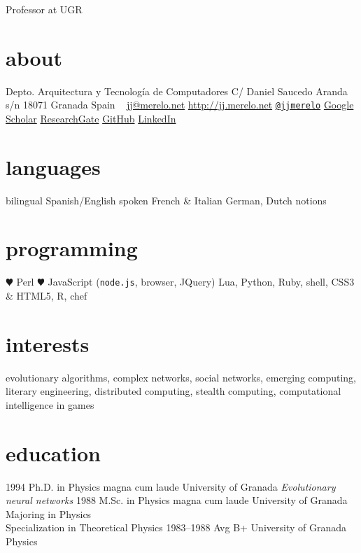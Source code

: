 \documentclass[]{friggeri-jj-cv}
\begin{document}
       {Professor at UGR}

\begin{aside}
  \section{about}
    Depto. Arquitectura y Tecnología de Computadores
    C/ Daniel Saucedo Aranda s/n
    18071 Granada
    Spain
    ~
    \href{mailto:jj@meremarbolo.net}{jj@merelo.net}
    \href{http://jj.merelo.net}{http://jj.merelo.net}
    \href{http://twitter.com/jjmerelo}{{\tt @jjmerelo}}
    \href{http://scholar.google.com/citations?user=gFxqc64AAAAJ}{Google Scholar}
   \href{https://www.researchgate.net/profile/JJ_Merelo}{ResearchGate}
   \href{https://github.com/JJ}{GitHub}
   \href{http://lnkd.in/dBVqYPa}{LinkedIn}
  \section{languages}
    bilingual Spanish/English
    spoken French \& Italian
    German, Dutch notions
  \section{programming}
    {\color{red} \large $\varheartsuit$} Perl
    {\color{red} $\varheartsuit$} JavaScript ({\tt node.js}, browser, JQuery)
    Lua, Python, Ruby, shell, CSS3 \& HTML5, R, chef
\end{aside}

\section{interests}

evolutionary algorithms, complex networks, social networks, emerging
computing, literary engineering, distributed computing, stealth
computing, computational intelligence in games

\section{education}

\begin{entrylist}
  \entry
    {1994}
    {Ph.D. {\normalfont in Physics} magna cum laude}
    {University of Granada}
    {\emph{Evolutionary neural networks}}
  \entry
    {1988}
    {M.Sc. {\normalfont in Physics} magna cum laude}
    {University of Granada}
    {Majoring in Physics\\
    Specialization in Theoretical Physics}
  \entry
    {1983–1988}
    {Avg B+}
    {University of Granada}
    {Physics}
\end{entrylist}
\end{document}
